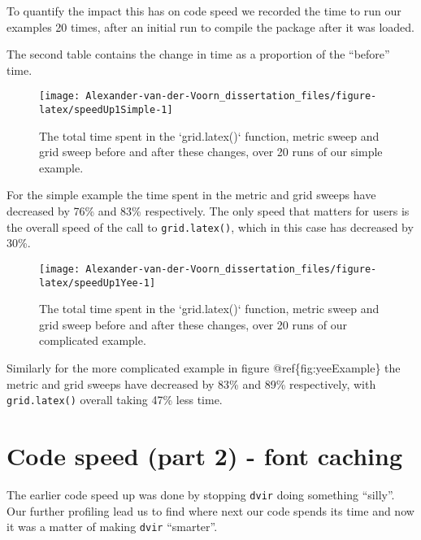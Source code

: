 \documentclass[]{article}
\begin{document}
To quantify the impact this has on code speed we recorded the time to
run our examples 20 times, after an initial run to compile the package
after it was loaded.

The second table contains the change in time as a proportion of the
``before'' time.

\begin{figure}

{\centering \texttt{[image: Alexander-van-der-Voorn\_dissertation\_files/figure-latex/speedUp1Simple-1]} 

}

\caption{The total time spent in the `grid.latex()` function, metric sweep and grid sweep before and after these changes, over 20 runs of our simple example.}\label{fig:speedUp1Simple}
\end{figure}

For the simple example the time spent in the metric and grid sweeps have
decreased by 76\% and 83\% respectively. The only speed that matters for
users is the overall speed of the call to \texttt{grid.latex()}, which
in this case has decreased by 30\%.

\begin{figure}

{\centering \texttt{[image: Alexander-van-der-Voorn\_dissertation\_files/figure-latex/speedUp1Yee-1]} 

}

\caption{The total time spent in the `grid.latex()` function, metric sweep and grid sweep before and after these changes, over 20 runs of our complicated example.}\label{fig:speedUp1Yee}
\end{figure}

Similarly for the more complicated example in figure
@ref\{fig:yeeExample\} the metric and grid sweeps have decreased by 83\%
and 89\% respectively, with \texttt{grid.latex()} overall taking 47\%
less time.

\newpage{}

\section{Code speed (part 2) - font
caching}\label{code-speed-part-2---font-caching}

The earlier code speed up was done by stopping \texttt{dvir} doing
something ``silly''. Our further profiling lead us to find where next
our code spends its time and now it was a matter of making \texttt{dvir}
``smarter''.
\end{document}
